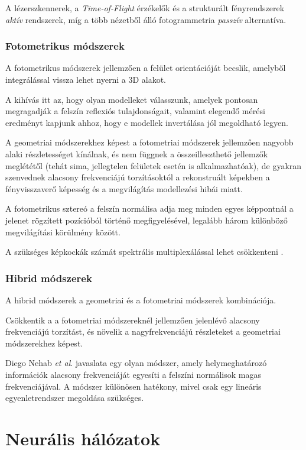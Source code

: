\documentclass[12pt,a4]{article}
\begin{document}
	
	A lézerszkennerek, a \textit{Time-of-Flight} érzékelők és a strukturált fényrendszerek \textit{aktív} rendszerek, míg a több nézetből álló fotogrammetria \textit{passzív} alternatíva.
	
	\subsubsection{Fotometrikus módszerek}
	A fotometrikus módszerek \cite{3dmm} jellemzően a felület orientációját becslik, amelyből integrálással vissza lehet nyerni a 3D alakot.
	
	 A kihívás itt az, hogy olyan modelleket válasszunk, amelyek pontosan megragadják a felszín reflexiós tulajdonságait, valamint elegendő mérési eredményt kapjunk ahhoz, hogy e modellek invertálása jól megoldható legyen. 
	 
	 
	 A geometriai módszerekhez képest a fotometriai módszerek
	 jellemzően nagyobb alaki részletességet kínálnak, és nem függnek a
	 összeilleszthető jellemzők meglététől
	(tehát sima, jellegtelen felületek esetén is alkalmazhatóak), de gyakran szenvednek alacsony frekvenciájú torzításoktól a rekonstruált képekben
	a fényvisszaverő képesség és a megvilágítás modellezési hibái miatt.
	
	
	A fotometrikus sztereó \cite{photometric} a felszín normálisa adja meg minden egyes képpontnál a jelenet rögzített pozícióból történő megfigyelésével, legalább három különböző megvilágítási körülmény között.
	
	 A szükséges képkockák számát spektrális multiplexálással lehet csökkenteni \cite{multiplex}.
	
	\subsubsection{Hibrid módszerek}
	A hibrid módszerek \cite{3dmm} a
	geometriai és a fotometriai módszerek kombinációja. 
	
	Csökkentik a
	a fotometriai módszereknél jellemzően jelenlévő alacsony frekvenciájú torzítást, és
	növelik a nagyfrekvenciájú részleteket a geometriai módszerekhez képest. 
	
	Diego Nehab \textit{et al}. \cite{hibrid} javaslata egy olyan módszer, amely helymeghatározó információk alacsony frekvenciáját egyesíti a felszíni normálisok magas frekvenciájával. 
	A módszer különösen hatékony, mivel csak egy lineáris egyenletrendszer megoldása szükséges. 
	
	\section{Neurális hálózatok}
\end{document}
